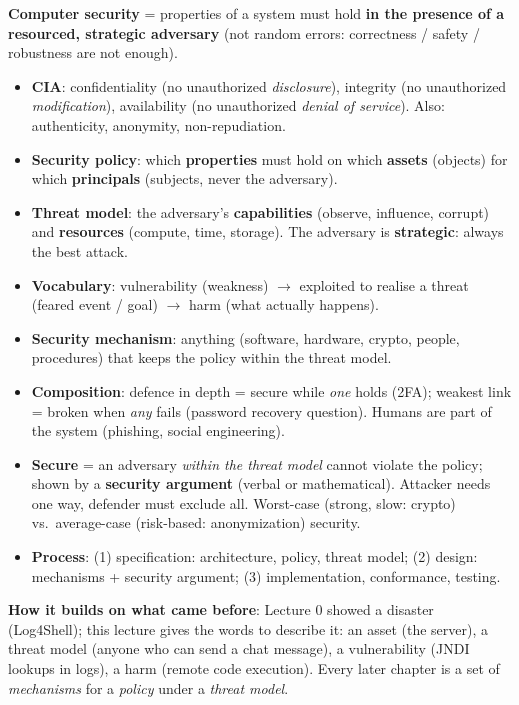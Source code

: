 \begin{recapbox}[title={Exam-ready recap --- Lecture 1: Basics}]
\textbf{Computer security} = properties of a system must hold \textbf{in the presence of a
resourced, strategic adversary} (not random errors: correctness / safety / robustness are not
enough).
\begin{itemize}
  \item \textbf{CIA}: confidentiality (no unauthorized \emph{disclosure}), integrity (no
        unauthorized \emph{modification}), availability (no unauthorized \emph{denial of
        service}). Also: authenticity, anonymity, non-repudiation.
  \item \textbf{Security policy}: which \textbf{properties} must hold on which \textbf{assets}
        (objects) for which \textbf{principals} (subjects, never the adversary).
  \item \textbf{Threat model}: the adversary's \textbf{capabilities} (observe, influence,
        corrupt) and \textbf{resources} (compute, time, storage). The adversary is
        \textbf{strategic}: always the best attack.
  \item \textbf{Vocabulary}: vulnerability (weakness) $\to$ exploited to realise a threat (feared
        event / goal) $\to$ harm (what actually happens).
  \item \textbf{Security mechanism}: anything (software, hardware, crypto, people, procedures)
        that keeps the policy within the threat model.
  \item \textbf{Composition}: defence in depth = secure while \emph{one} holds (2FA); weakest
        link = broken when \emph{any} fails (password recovery question). Humans are part of the
        system (phishing, social engineering).
  \item \textbf{Secure} = an adversary \emph{within the threat model} cannot violate the
        policy; shown by a \textbf{security argument} (verbal or mathematical). Attacker needs
        one way, defender must exclude all. Worst-case (strong, slow: crypto) vs.\ average-case
        (risk-based: anonymization) security.
  \item \textbf{Process}: (1) specification: architecture, policy, threat model; (2) design:
        mechanisms + security argument; (3) implementation, conformance, testing.
\end{itemize}
\textbf{How it builds on what came before}: Lecture 0 showed a disaster (Log4Shell); this
lecture gives the words to describe it: an asset (the server), a threat model (anyone who can send
a chat message), a vulnerability (JNDI lookups in logs), a harm (remote code execution). Every
later chapter is a set of \emph{mechanisms} for a \emph{policy} under a \emph{threat model}.
\end{recapbox}

